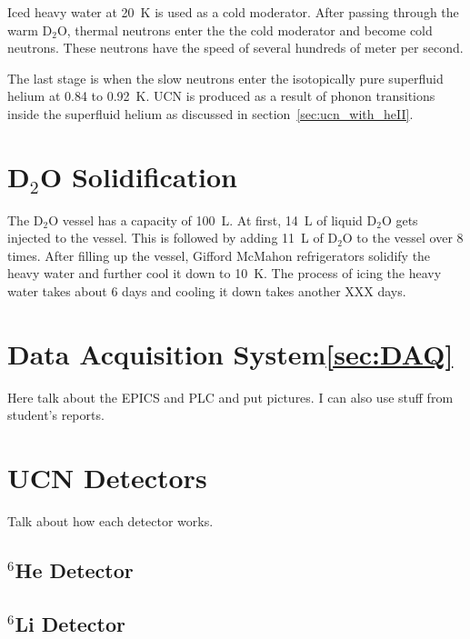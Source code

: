 Iced heavy water at 20~K is used as a cold moderator. After passing
through the warm D$_2$O, thermal neutrons enter the the cold moderator
and become cold neutrons. These neutrons have the speed of several
hundreds of meter per second.

The last stage is when the slow neutrons enter the isotopically pure superfluid helium
at 0.84 to 0.92~K. UCN is produced as a result of phonon transitions
inside the superfluid helium as discussed in section~\ref{sec:ucn_with_heII}.


\section{D$_2$O Solidification}
The D$_2$O vessel has a capacity of 100~L. At first, 14~L of liquid
D$_2$O gets injected to the vessel. This is followed by adding 11~L of
D$_2$O to the vessel over 8 times.  After filling up the vessel,
Gifford McMahon refrigerators solidify the heavy water and further
cool it down to 10~K. The process of icing the heavy water takes about
6 days and cooling it down takes another XXX days.

\section{Data Acquisition System\ref{sec:DAQ}}
Here talk about the EPICS and PLC and put pictures. I can also use
stuff from student's reports.

\section{UCN Detectors}
Talk about how each detector works.
\subsection{$^6$He Detector}
\subsection{$^6$Li Detector}




